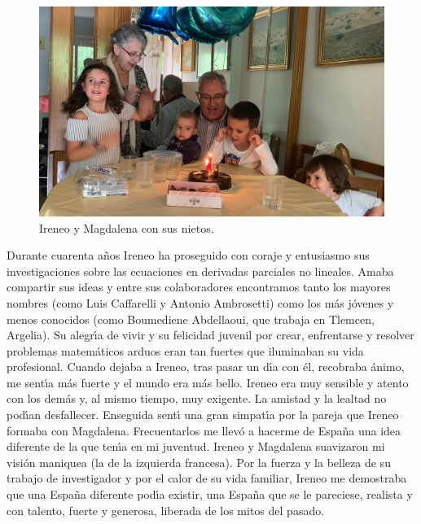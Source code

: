 \begin{figure}%
\begin{center}
\includegraphics[width=0.9\linewidth]{IP_foto_Nietos2.jpg}
\caption{Ireneo y Magdalena con sus nietos.}
\end{center}
\end{figure}
    


Durante cuarenta a\~nos  Ireneo ha proseguido con coraje  y entusiasmo sus investigaciones sobre las ecuaciones en derivadas parciales no lineales. Amaba compartir sus ideas y entre sus colaboradores encontramos tanto los mayores nombres (como Luis Caffarelli y Antonio Ambrosetti) como los m\'as j\'ovenes y menos conocidos (como Boumediene Abdellaoui, que trabaja en Tlemcen, Argelia). Su alegr{\'\i}a de vivir y su felicidad juvenil por crear, enfrentarse y resolver problemas matem\'aticos arduos eran tan fuertes que iluminaban su vida profesional. Cuando dejaba a Ireneo, tras pasar un d\'{\i}a con \'el, recobraba \'animo, me sent{\'\i}a m\'as fuerte y el mundo era m\'as bello.
Ireneo era muy sensible y atento con  los dem\'as y, al mismo tiempo, muy exigente. La amistad y la lealtad no pod{\'\i}an desfallecer. Enseguida sent{\'\i} una gran 
simpat{\'\i}a por la pareja que Ireneo formaba con Magdalena. Frecuentarlos me llev\'o a hacerme de Espa\~na una idea diferente de la que ten{\'\i}a en mi juventud. Ireneo y Magdalena suavizaron mi visi\'on maniquea (la de la izquierda francesa). Por la fuerza y la belleza de su trabajo de investigador y por el calor de su vida familiar, Ireneo me demostraba que una Espa\~na diferente pod{\'\i}a existir, una Espa\~na que se le pareciese, realista y con talento, fuerte y generosa, liberada de los mitos del pasado. 

%
%
%


\begin{center}
\mbox{}\\[.1ex]
\resizebox{.5\linewidth}{!}{\color{azulsema}\rule{.5\linewidth}{1pt}
{\large $\diamond$} {\huge $\diamond$} {\large $\diamond$} \rule{.5\linewidth}{1pt}}
\end{center}

